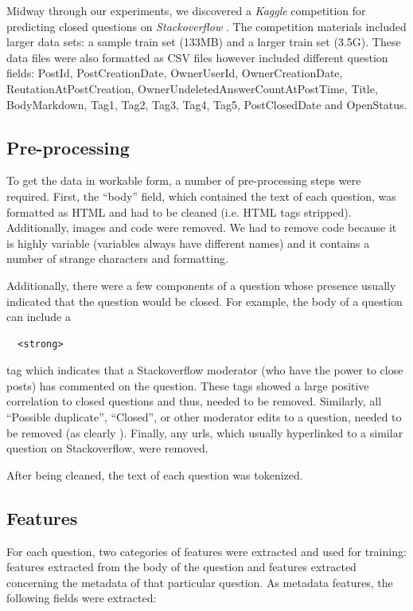 \documentclass[11pt]{article}
\begin{document}
Midway through our experiments, we discovered a \emph{Kaggle}
competition for predicting closed questions on \emph{Stackoverflow}
\cite{website:kaggle}. The competition materials included larger data sets: a
sample train set (133MB) and a larger train set (3.5G).  These data
files were also formatted as CSV files however included different
question fields: PostId, PostCreationDate, OwnerUserId,
OwnerCreationDate, ReutationAtPostCreation,
OwnerUndeletedAnswerCountAtPostTime, Title, BodyMarkdown, Tag1, Tag2,
Tag3, Tag4, Tag5, PostClosedDate and OpenStatus.

\subsection{Pre-processing}
To get the data in workable form, a number of pre-processing steps
were required. First, the ``body'' field, which contained the text of
each question, was formatted as HTML and had to be
cleaned (i.e. HTML tags stripped). Additionally, images and code were
removed.  We had to remove code because it is highly variable
(variables always have different names) and it contains a number of
strange characters and formatting.

Additionally, there were a few components of a question whose presence
usually indicated that the question would be closed.  For example, the
body of a question can include a \begin{verbatim}
  <strong> \end{verbatim} tag which indicates that a Stackoverflow
moderator (who have the power to close posts) has commented on the
question. These tags showed a large positive correlation to closed
questions and thus, needed to be removed. Similarly, all ``Possible
duplicate'', ``Closed'', or other moderator edits to a question, needed to be
removed (as clearly ).  Finally, any urls, which usually hyperlinked to a similar
question on Stackoverflow, were removed.

After being cleaned, the text of each question was tokenized.

\subsection{Features}

For each question, two categories of features were extracted and used
for training: features extracted from the body of the question and
features extracted concerning the metadata of that particular
question. As metadata features, the following fields were extracted:
\end{document}
